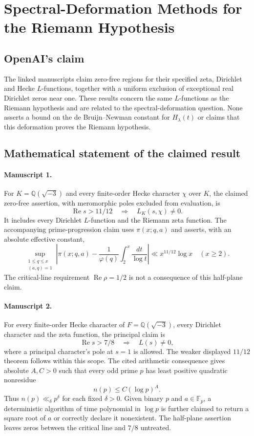 \documentclass[11pt]{article}
\begin{document}
\section*{Spectral-Deformation Methods for the Riemann Hypothesis}

\subsection{OpenAI's claim}
The linked manuscripts claim zero-free regions for their specified zeta, Dirichlet and Hecke $L$-functions, together with a uniform exclusion of exceptional real Dirichlet zeros near one. These results concern the same $L$-functions as the Riemann hypothesis and are related to the spectral-deformation question. None asserts a bound on the de Bruijn--Newman constant for $H_\lambda(t)$ or claims that this deformation proves the Riemann hypothesis.

\subsection{Mathematical statement of the claimed result}
\paragraph{Manuscript 1.}
For $K=\mathbb Q(\sqrt{-3})$ and every finite-order Hecke character $\chi$ over $K$, the claimed zero-free assertion, with meromorphic poles excluded from evaluation, is
\[
 \operatorname{Re}s>11/12\quad\Longrightarrow\quad L_K(s,\chi)\ne0.
\]
It includes every Dirichlet $L$-function and the Riemann zeta function. The accompanying prime-progression claim uses $\pi(x;q,a)$ and asserts, with an absolute effective constant,
\[
 \sup_{\substack{1\le q\le x\\(a,q)=1}}
 \left|\pi(x;q,a)-\frac1{\varphi(q)}\int_2^x\frac{dt}{\log t}\right|
 \ll x^{11/12}\log x\quad(x\ge2).
\]
The critical-line requirement $\operatorname{Re}\rho=1/2$ is not a consequence of this half-plane claim.

\paragraph{Manuscript 2.}
For every finite-order Hecke character of $F=\mathbb Q(\sqrt{-3})$, every Dirichlet character and the zeta function, the principal claim is
\[
 \operatorname{Re}s>7/8\quad\Longrightarrow\quad L(s)\ne0,
\]
where a principal character's pole at $s=1$ is allowed. The weaker displayed $11/12$ theorem follows within this scope. The cited arithmetic consequence gives absolute $A,C>0$ such that every odd prime $p$ has least positive quadratic nonresidue
\[
 n(p)\le C(\log p)^A.
\]
Thus $n(p)\ll_{\delta} p^{\delta}$ for each fixed $\delta>0$. Given binary $p$ and $a\in\mathbb F_p$, a deterministic algorithm of time polynomial in $\log p$ is further claimed to return a square root of $a$ or correctly declare it nonexistent. The half-plane assertion leaves zeros between the critical line and $7/8$ untreated.
\end{document}
